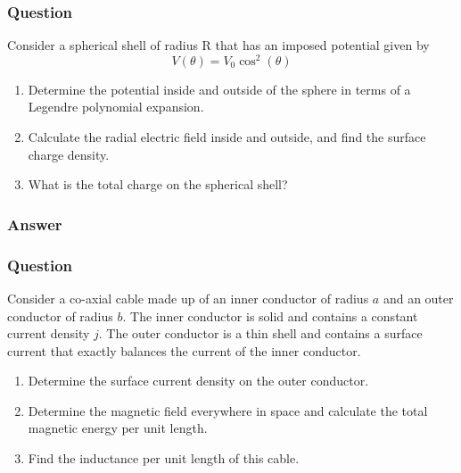 \subsubsection{Question}
Consider a spherical shell of radius R that has an imposed potential given by
\begin{equation*}
	V(\theta) = V_0\cos^2(\theta)
\end{equation*}
\begin{enumerate}
	\item Determine the potential inside and outside of the sphere in terms of a Legendre polynomial expansion.
	\item Calculate the radial electric field inside and outside, and find the surface charge density.
	\item What is the total charge on the spherical shell?
\end{enumerate}
\subsubsection{Answer}



\subsubsection{Question}
Consider a co-axial cable made up of an inner conductor of radius $a$ and an outer conductor of radius $b$. The inner conductor is solid and contains a constant current density $j$. The outer conductor is a thin shell and contains a surface current that exactly balances the current of the inner conductor.
\begin{enumerate}
	\item Determine the surface current density on the outer conductor.
	\item Determine the magnetic field everywhere in space and calculate the total magnetic energy per unit length.
	\item Find the inductance per unit length of this cable.
\end{enumerate}
